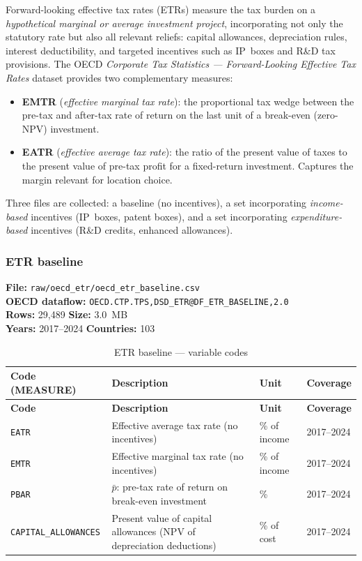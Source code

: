 \documentclass[11pt,a4paper]{article}
\newcommand{\code}[1]{\texttt{#1}}
\begin{document}
Forward-looking effective tax rates (ETRs) measure the tax burden on a
\emph{hypothetical marginal or average investment project}, incorporating not
only the statutory rate but also all relevant reliefs: capital allowances,
depreciation rules, interest deductibility, and targeted incentives such as
IP~boxes and R\&D tax provisions.  The OECD \emph{Corporate Tax Statistics ---
Forward-Looking Effective Tax Rates} dataset provides two complementary measures:

\begin{itemize}[noitemsep]
    \item \textbf{EMTR} (\emph{effective marginal tax rate}): the proportional tax
    wedge between the pre-tax and after-tax rate of return on the last unit of a
    break-even (zero-NPV) investment.
    \item \textbf{EATR} (\emph{effective average tax rate}): the ratio of the
    present value of taxes to the present value of pre-tax profit for a
    fixed-return investment.  Captures the margin relevant for location choice.
\end{itemize}

Three files are collected: a baseline (no incentives), a set incorporating
\emph{income-based} incentives (IP~boxes, patent boxes), and a set incorporating
\emph{expenditure-based} incentives (R\&D credits, enhanced allowances).

\subsubsection{ETR baseline}

\textbf{File:} \texttt{raw/oecd\_etr/oecd\_etr\_baseline.csv}\\
\textbf{OECD dataflow:} \texttt{OECD.CTP.TPS,DSD\_ETR@DF\_ETR\_BASELINE,2.0}\\
\textbf{Rows:} 29{,}489 \quad \textbf{Size:} 3.0~MB\\
\textbf{Years:} 2017--2024 \quad \textbf{Countries:} 103

\begin{longtable}{@{}L{3.2cm} L{6.0cm} C{2.0cm} C{2.5cm}@{}}
\caption{ETR baseline --- variable codes}\label{tab:etr_baseline}\\
\toprule
\textbf{Code (MEASURE)} & \textbf{Description} & \textbf{Unit} & \textbf{Coverage} \\
\midrule
\endfirsthead
\toprule
\textbf{Code} & \textbf{Description} & \textbf{Unit} & \textbf{Coverage} \\
\midrule
\endhead
\bottomrule
\endlastfoot
\code{EATR}               & Effective average tax rate (no incentives) & \% of income & 2017--2024 \\
\code{EMTR}               & Effective marginal tax rate (no incentives) & \% of income & 2017--2024 \\
\code{PBAR}               & $\bar{p}$: pre-tax rate of return on break-even investment & \% & 2017--2024 \\
\code{CAPITAL\_ALLOWANCES}& Present value of capital allowances (NPV of depreciation deductions) & \% of cost & 2017--2024 \\
\end{longtable}
\end{document}
